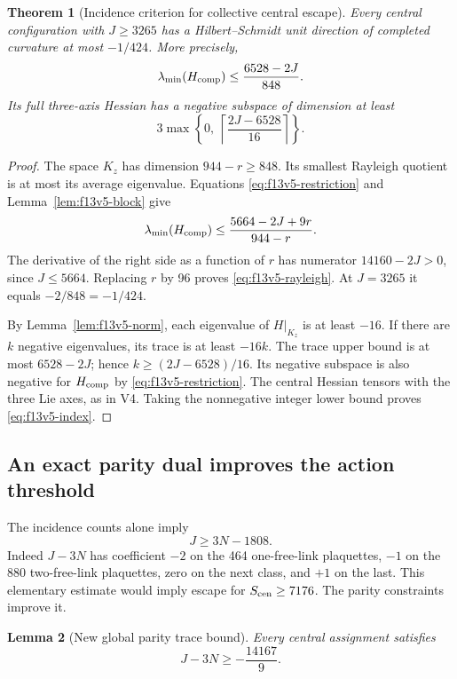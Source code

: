 \documentclass[11pt,oneside]{article}
\newtheorem{theorem}{Theorem}[section]
\newtheorem{lemma}[theorem]{Lemma}
\begin{document}
\begin{theorem}[Incidence criterion for collective central escape]
\label{thm:f13v5-trace}
Every central configuration with \(J\ge3265\) has a
Hilbert--Schmidt unit direction of completed curvature
at most \(-1/424\). More precisely,
\begin{equation}\label{eq:f13v5-rayleigh}
 \lambda_{\min}(H_{\rm comp})
 \le\frac{6528-2J}{848}.
\end{equation}
Its full three-axis Hessian has a negative subspace
of dimension at least
\begin{equation}\label{eq:f13v5-index}
 3\max\left\{0,\
 \left\lceil\frac{2J-6528}{16}\right\rceil\right\}.
\end{equation}
\end{theorem}

\begin{proof}
The space \(K_z\) has dimension \(944-r\ge848\).
Its smallest Rayleigh quotient is at most its
average eigenvalue. Equations
\eqref{eq:f13v5-restriction} and
Lemma~\ref{lem:f13v5-block} give
\[
 \lambda_{\min}(H_{\rm comp})
 \le\frac{5664-2J+9r}{944-r}.
\]
The derivative of the right side as a function of
\(r\) has numerator \(14160-2J>0\), since \(J\le5664\).
Replacing \(r\) by 96 proves
\eqref{eq:f13v5-rayleigh}. At \(J=3265\) it equals
\(-2/848=-1/424\).

By Lemma~\ref{lem:f13v5-norm}, each eigenvalue of
\(H|_{K_z}\) is at least \(-16\). If there are \(k\)
negative eigenvalues, its trace is at least \(-16k\).
The trace upper bound is at most \(6528-2J\);
hence \(k\ge(2J-6528)/16\). Its negative subspace
is also negative for \(H_{\rm comp}\) by
\eqref{eq:f13v5-restriction}. The central Hessian
tensors with the three Lie axes, as in V4.
Taking the nonnegative integer lower bound proves
\eqref{eq:f13v5-index}.
\end{proof}

\subsection{An exact parity dual improves the action threshold}

The incidence counts alone imply
\[
 J\ge3N-1808.
\]
Indeed \(J-3N\) has coefficient \(-2\) on the 464
one-free-link plaquettes, \(-1\) on the 880
two-free-link plaquettes, zero on the next class,
and \(+1\) on the last. This elementary estimate
would imply escape for \(S_{\rm cen}\ge7176\).
The parity constraints improve it.

\begin{lemma}[New global parity trace bound]
\label{lem:f13v5-dual}
Every central assignment satisfies
\begin{equation}\label{eq:f13v5-dual}
 J-3N\ge-\frac{14167}{9}.
\end{equation}
\end{lemma}
\end{document}
